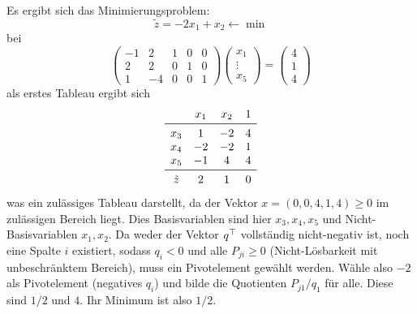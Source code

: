 \begin{solution}
    \begin{tasks}
            \item Es ergibt sich das Minimierungsproblem:
        $$ \tilde z = -2x_1+x_2 \leftarrow \min $$
        bei
        $$
        \begin{pmatrix}
            -1 & 2 & 1 & 0 & 0\\
            2 & 2 & 0 & 1 & 0\\
            1 & -4 & 0 & 0 & 1 
        \end{pmatrix}
        \begin{pmatrix}
            x_1\\
            \vdots\\
            x_5
        \end{pmatrix}
        = \begin{pmatrix}
            4\\
            1\\
            4
            \end{pmatrix}
            $$
            als erstes Tableau ergibt sich
            $$
            \begin{matrix}
                & x_1 & x_2 & 1\\
                \midrule
                x_3 & 1 & -2 & 4\\
                x_4 & -2 & -2 & 1\\
                x_5 & -1 & 4 & 4\\
                \midrule
                \tilde z & 2 & 1 & 0 
            \end{matrix}
            $$
            was ein zulässiges Tableau darstellt, da der Vektor $x=(0,0,4,1,4)\geq 0$ im zulässigen Bereich liegt. Dies Basisvariablen sind hier $x_3,x_4,x_5$ und Nicht-Basisvariablen $x_1,x_2$.
            Da weder der Vektor $q^\top$ vollständig nicht-negativ ist, noch eine Spalte $i$ existiert, sodass $q_i<0$ und alle $P_{ji}\geq 0$ (Nicht-Lösbarkeit mit unbeschränktem Bereich), muss ein Pivotelement gewählt werden.
            Wähle also $-2$ als Pivotelement (negatives $q_i$) und bilde die Quotienten $P_{j1}/q_1$ für alle. Diese sind $1/2$ und $4$. Ihr Minimum ist also $1/2$.


\end{tasks}
\end{solution}
